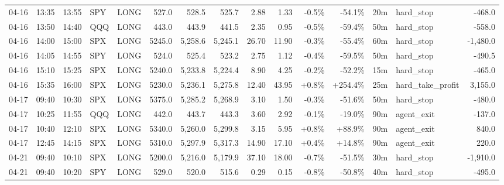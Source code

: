 \documentclass[11pt,a4paper,twoside]{article}
\begin{document}
\begin{landscape}
\begin{center}
\begin{longtable}{>{\color{txtmain}}l l l l l r r r r r r r r >{\color{txtmain}}l r}
04-16 & 13:35 & 13:55 & SPY & LONG & 527.0 & 528.5 & 525.7 & 2.88 & 1.33 & \textcolor{lossred}{-0.5\%} & \textcolor{lossred}{-54.1\%} & 20m & hard\_stop & \textcolor{lossred}{-468.0} \\
04-16 & 13:50 & 14:40 & QQQ & LONG & 443.0 & 443.9 & 441.5 & 2.35 & 0.95 & \textcolor{lossred}{-0.5\%} & \textcolor{lossred}{-59.4\%} & 50m & hard\_stop & \textcolor{lossred}{-558.0} \\
04-16 & 14:00 & 15:00 & SPX & LONG & 5245.0 & 5,258.6 & 5,245.1 & 26.70 & 11.90 & \textcolor{lossred}{-0.3\%} & \textcolor{lossred}{-55.4\%} & 60m & hard\_stop & \textcolor{lossred}{-1,480.0} \\
04-16 & 14:05 & 14:55 & SPY & LONG & 524.0 & 525.4 & 523.2 & 2.75 & 1.12 & \textcolor{lossred}{-0.4\%} & \textcolor{lossred}{-59.5\%} & 50m & hard\_stop & \textcolor{lossred}{-490.5} \\
04-16 & 15:10 & 15:25 & SPX & LONG & 5240.0 & 5,233.8 & 5,224.4 & 8.90 & 4.25 & \textcolor{lossred}{-0.2\%} & \textcolor{lossred}{-52.2\%} & 15m & hard\_stop & \textcolor{lossred}{-465.0} \\
04-16 & 15:35 & 16:00 & SPX & LONG & 5230.0 & 5,236.1 & 5,275.8 & 12.40 & 43.95 & \textcolor{wingreen}{+0.8\%} & \textcolor{wingreen}{+254.4\%} & 25m & hard\_take\_profit & \textcolor{wingreen}{3,155.0} \\
04-17 & 09:40 & 10:30 & SPX & LONG & 5375.0 & 5,285.2 & 5,268.9 & 3.10 & 1.50 & \textcolor{lossred}{-0.3\%} & \textcolor{lossred}{-51.6\%} & 50m & hard\_stop & \textcolor{lossred}{-480.0} \\
04-17 & 10:25 & 11:55 & QQQ & LONG & 442.0 & 443.7 & 443.3 & 3.60 & 2.92 & \textcolor{lossred}{-0.1\%} & \textcolor{lossred}{-19.0\%} & 90m & agent\_exit & \textcolor{lossred}{-137.0} \\
04-17 & 10:40 & 12:10 & SPX & LONG & 5340.0 & 5,260.0 & 5,299.8 & 3.15 & 5.95 & \textcolor{wingreen}{+0.8\%} & \textcolor{wingreen}{+88.9\%} & 90m & agent\_exit & \textcolor{wingreen}{840.0} \\
04-17 & 12:45 & 14:15 & SPX & LONG & 5310.0 & 5,297.9 & 5,317.3 & 14.90 & 17.10 & \textcolor{wingreen}{+0.4\%} & \textcolor{wingreen}{+14.8\%} & 90m & agent\_exit & \textcolor{wingreen}{220.0} \\
04-21 & 09:40 & 10:10 & SPX & LONG & 5200.0 & 5,216.0 & 5,179.9 & 37.10 & 18.00 & \textcolor{lossred}{-0.7\%} & \textcolor{lossred}{-51.5\%} & 30m & hard\_stop & \textcolor{lossred}{-1,910.0} \\
04-21 & 09:40 & 10:20 & SPY & LONG & 529.0 & 520.0 & 515.6 & 0.29 & 0.15 & \textcolor{lossred}{-0.8\%} & \textcolor{lossred}{-50.8\%} & 40m & hard\_stop & \textcolor{lossred}{-495.0} \\

\end{longtable}
\end{center}
\end{landscape}
\end{document}
